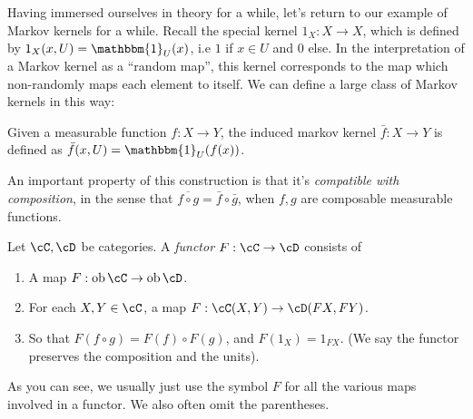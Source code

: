 \documentclass{article}
\DeclareMathOperator{\ob}{ob}
\begin{document}
Having immersed ourselves in theory for a while, let's return to our example of Markov kernels for a while.
Recall the special kernel $1_X: X \to X$, which is defined by $1_X(x,U) = \mathbbm{1}_U(x)$,  i.e $1$ if $x \in U$ and $0$ else.
In the interpretation of a Markov kernel as a ``random map'', this kernel corresponds to the map which non-randomly maps each element to itself.
We can define a large class of Markov kernels in this way:
\begin{definition}
    Given a measurable function $f: X \to Y$, the induced markov kernel $\bar{f}: X \to Y$ is defined as $\bar{f}(x,U) = \mathbbm{1}_U(f(x))$.
\end{definition}
An important property of this construction is that it's \emph{compatible with composition}, in the sense that $\overline{f \circ g} = \bar{f} \circ \bar{g}$,
when $f,g$ are composable measurable functions.

\begin{definition}
    Let $\cC, \cD$ be categories. A \emph{functor} $F: \cC \to \cD$ consists of
    \begin{enumerate}
        \item A map $F: \ob \cC \to \ob \cD$.
        \item For each $X,Y \in \cC$, a map $F: \cC(X,Y) \to \cD(FX,FY)$.
        \item So that $F(f\circ g) = F(f) \circ F(g)$, and $F(1_X) = 1_{FX}$. (We say the functor preserves the composition and the units).
    \end{enumerate}
\end{definition}
As you can see, we usually just use the symbol $F$ for all the various maps involved in a functor. We also often omit the parentheses.
\end{document}
